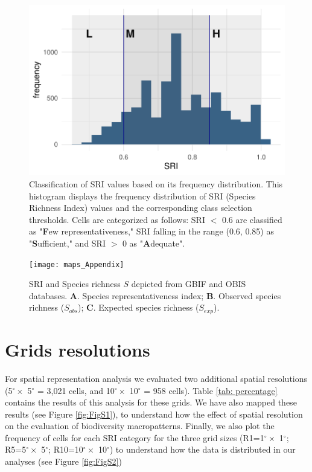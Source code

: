 \documentclass[12pt,authoryear]{elsarticle}
\begin{document}
\begin{figure}
  \centering
  \includegraphics[width=.65\textwidth]{SRI_hist}
  \caption{Classification of SRI values based on its frequency distribution. This histogram displays the frequency distribution of SRI (Species Richness Index) values and the corresponding class selection thresholds. Cells are categorized as follows: SRI $<$ 0.6 are classified as "\textbf{F}ew representativeness," SRI falling in the range (0.6, 0.85) as "\textbf{S}ufficient," and SRI $>$ 0 as "\textbf{A}dequate".
    \label{fig:SRI_hist}
  }

\end{figure}

\begin{figure}
  \centering
  \texttt{[image: maps\_Appendix]}
    \caption{SRI and Species richness $S$ depicted from GBIF and OBIS databases. \textbf{A}. Species representativeness index; \textbf{B}. Observed species richness ($S_{obs}$); \textbf{C}. Expected species richness ($S_{exp}$).  
    \label{fig:S+So+Es}
  }
  
\end{figure}


\section{Grids resolutions}
\label{sec: grids}

For spatial representation analysis we evaluated two additional spatial resolutions (5$^\circ \times$ 5$^\circ$ = 3,021 cells, and 10$^\circ \times$ 10$^\circ$ = 958 cells). Table \ref{tab: percentage} contains the results of this analysis for these grids. We have also mapped these results (see Figure \ref{fig:FigS1}), to understand how the effect of spatial resolution on the evaluation of biodiversity macropatterns. Finally, we also plot the frequency of cells for each SRI category for the three grid sizes (R1=1$^\circ \times$ 1$^\circ$; R5=5$^\circ \times$ 5$^\circ$; R10=10$^\circ \times$ 10$^\circ$) to understand how the data is distributed in our analyses (see Figure \ref{fig:FigS2})
\end{document}
